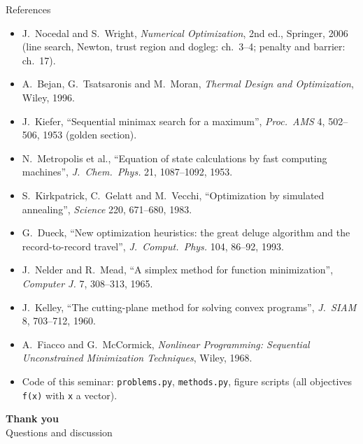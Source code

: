 \begin{frame}{References}
  \footnotesize
  \begin{itemize}
    \item J.\ Nocedal and S.\ Wright, \emph{Numerical Optimization}, 2nd ed., Springer, 2006 (line search, Newton, trust region and dogleg: ch.\ 3--4; penalty and barrier: ch.\ 17).
    \item A.\ Bejan, G.\ Tsatsaronis and M.\ Moran, \emph{Thermal Design and Optimization}, Wiley, 1996.
    \item J.\ Kiefer, ``Sequential minimax search for a maximum'', \emph{Proc.\ AMS} 4, 502--506, 1953 (golden section).
    \item N.\ Metropolis et al., ``Equation of state calculations by fast computing machines'', \emph{J.\ Chem.\ Phys.} 21, 1087--1092, 1953.
    \item S.\ Kirkpatrick, C.\ Gelatt and M.\ Vecchi, ``Optimization by simulated annealing'', \emph{Science} 220, 671--680, 1983.
    \item G.\ Dueck, ``New optimization heuristics: the great deluge algorithm and the record-to-record travel'', \emph{J.\ Comput.\ Phys.} 104, 86--92, 1993.
    \item J.\ Nelder and R.\ Mead, ``A simplex method for function minimization'', \emph{Computer J.} 7, 308--313, 1965.
    \item J.\ Kelley, ``The cutting-plane method for solving convex programs'', \emph{J.\ SIAM} 8, 703--712, 1960.
    \item A.\ Fiacco and G.\ McCormick, \emph{Nonlinear Programming: Sequential Unconstrained Minimization Techniques}, Wiley, 1968.
    \item Code of this seminar: \texttt{problems.py}, \texttt{methods.py}, figure scripts (all objectives \texttt{f(x)} with \texttt{x} a vector).
  \end{itemize}
\end{frame}

\begin{frame}[plain]
  \centering\vfill
  {\Large\bfseries Thank you}\\[0.4cm]
  Questions and discussion\vfill
\end{frame}


